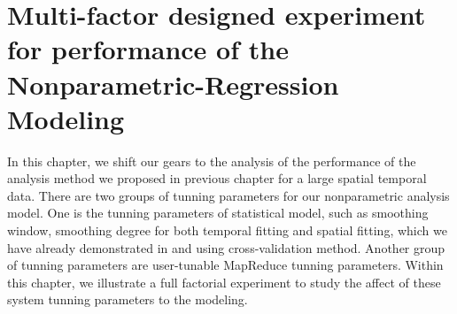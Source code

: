 \chapter{Multi-factor designed experiment for performance of the 
Nonparametric-Regression Modeling}

In this chapter, we shift our gears to the analysis of the performance of the 
analysis method we proposed in previous chapter for a large spatial temporal data.
There are two groups of tunning parameters for our nonparametric analysis model.
One is the tunning parameters of statistical model, such as smoothing window, 
smoothing degree for both temporal fitting and spatial fitting, which we have
already demonstrated in \cite{} and \cite{} using cross-validation method. Another
group of tunning parameters are user-tunable MapReduce tunning parameters. Within
this chapter, we illustrate a full factorial experiment to study the affect of
these system tunning parameters to the modeling.